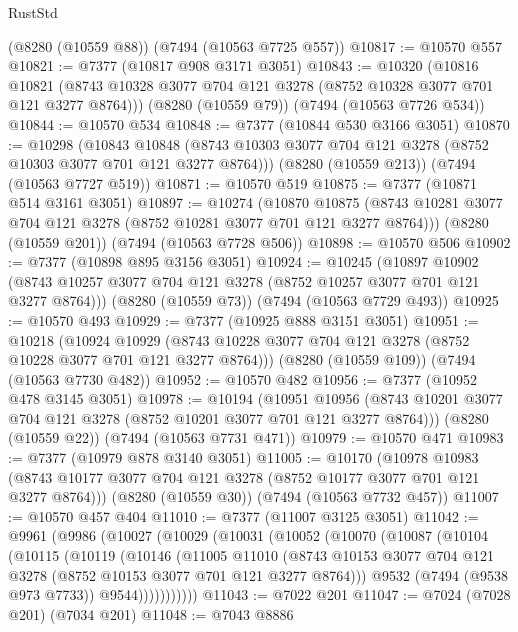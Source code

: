 \begin{lexlean}{RustStd}
\begin{coremodule}
    (@8280 (@10559 @88))
    (@7494 (@10563 @7725 @557))
@10817 := @10570 @557
@10821 := @7377 (@10817 @908 @3171 @3051)
@10843 := @10320
    (@10816 @10821 (@8743 @10328 @3077 @704 @121 @3278 (@8752 @10328 @3077 @701 @121 @3277 @8764)))
    (@8280 (@10559 @79))
    (@7494 (@10563 @7726 @534))
@10844 := @10570 @534
@10848 := @7377 (@10844 @530 @3166 @3051)
@10870 := @10298
    (@10843 @10848 (@8743 @10303 @3077 @704 @121 @3278 (@8752 @10303 @3077 @701 @121 @3277 @8764)))
    (@8280 (@10559 @213))
    (@7494 (@10563 @7727 @519))
@10871 := @10570 @519
@10875 := @7377 (@10871 @514 @3161 @3051)
@10897 := @10274
    (@10870 @10875 (@8743 @10281 @3077 @704 @121 @3278 (@8752 @10281 @3077 @701 @121 @3277 @8764)))
    (@8280 (@10559 @201))
    (@7494 (@10563 @7728 @506))
@10898 := @10570 @506
@10902 := @7377 (@10898 @895 @3156 @3051)
@10924 := @10245
    (@10897 @10902 (@8743 @10257 @3077 @704 @121 @3278 (@8752 @10257 @3077 @701 @121 @3277 @8764)))
    (@8280 (@10559 @73))
    (@7494 (@10563 @7729 @493))
@10925 := @10570 @493
@10929 := @7377 (@10925 @888 @3151 @3051)
@10951 := @10218
    (@10924 @10929 (@8743 @10228 @3077 @704 @121 @3278 (@8752 @10228 @3077 @701 @121 @3277 @8764)))
    (@8280 (@10559 @109))
    (@7494 (@10563 @7730 @482))
@10952 := @10570 @482
@10956 := @7377 (@10952 @478 @3145 @3051)
@10978 := @10194
    (@10951 @10956 (@8743 @10201 @3077 @704 @121 @3278 (@8752 @10201 @3077 @701 @121 @3277 @8764)))
    (@8280 (@10559 @22))
    (@7494 (@10563 @7731 @471))
@10979 := @10570 @471
@10983 := @7377 (@10979 @878 @3140 @3051)
@11005 := @10170
    (@10978 @10983 (@8743 @10177 @3077 @704 @121 @3278 (@8752 @10177 @3077 @701 @121 @3277 @8764)))
    (@8280 (@10559 @30))
    (@7494 (@10563 @7732 @457))
@11007 := @10570 @457 @404
@11010 := @7377 (@11007 @3125 @3051)
@11042 := @9961
    (@9986
      (@10027
        (@10029
          (@10031
            (@10052
              (@10070
                (@10087
                  (@10104
                    (@10115
                      (@10119
                        (@10146
                          (@11005
                            @11010
                            (@8743
                              @10153
                              @3077
                              @704
                              @121
                              @3278
                              (@8752 @10153 @3077 @701 @121 @3277 @8764)))
                          @9532
                          (@7494 (@9538 @973 @7733))
                          @9544)))))))))))
@11043 := @7022 @201
@11047 := @7024 (@7028 @201) (@7034 @201)
@11048 := @7043 @8886

\end{coremodule}
\end{lexlean}
